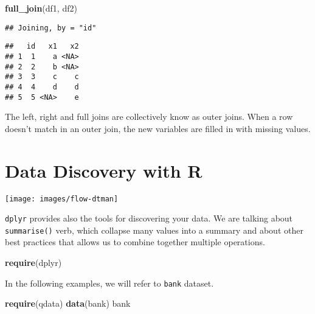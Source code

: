\documentclass[]{book}
\newenvironment{Shaded}{\begin{snugshade}}{\end{snugshade}}
\newcommand{\KeywordTok}[1]{\textcolor[rgb]{0.13,0.29,0.53}{\textbf{{#1}}}}
\newcommand{\NormalTok}[1]{{#1}}
\begin{document}
\begin{Shaded}
\begin{Highlighting}[]
\KeywordTok{full_join}\NormalTok{(df1, df2)}
\end{Highlighting}
\end{Shaded}

\begin{verbatim}
## Joining, by = "id"
\end{verbatim}

\begin{verbatim}
##   id   x1   x2
## 1  1    a <NA>
## 2  2    b <NA>
## 3  3    c    c
## 4  4    d    d
## 5  5 <NA>    e
\end{verbatim}

The left, right and full joins are collectively know as outer joins.
When a row doesn't match in an outer join, the new variables are filled
in with missing values.

\chapter{Data Discovery with R}\label{data-discovery-with-r}

\texttt{[image: images/flow-dtman]}

\texttt{dplyr} provides also the tools for discovering your data. We are
talking about \texttt{summarise()} verb, which collapse many values into
a summary and about other best practices that allows us to combine
together multiple operations.

\begin{Shaded}
\begin{Highlighting}[]
\KeywordTok{require}\NormalTok{(dplyr)}
\end{Highlighting}
\end{Shaded}

In the following examples, we will refer to \texttt{bank} dataset.

\begin{Shaded}
\begin{Highlighting}[]
\KeywordTok{require}\NormalTok{(qdata)}
\KeywordTok{data}\NormalTok{(bank)}
\NormalTok{bank}
\end{Highlighting}
\end{Shaded}
\end{document}
